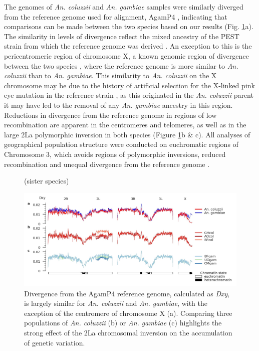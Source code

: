 \documentclass[a4paper,11pt,abstracton,hidelinks]{scrartcl}
\begin{document}
The genomes of \textit{An. coluzzii} and \textit{An. gambiae} samples were similarly diverged from the reference genome used for alignment, AgamP4 \cite{Holt2002}, indicating that comparisons can be made between the two species based on our results (Fig. \ref{refdiff}a).
%
The similarity in levels of divergence reflect the mixed ancestry of the PEST strain from which the reference genome was derived \cite{Holt2002}.
%
An exception to this is the pericentromeric region of chromosome X, a known genomic region of divergence between the two species \cite{Ag1000gConsortium2017}, where the reference genome is more similar to \textit{An. coluzzii} than to \textit{An. gambiae}.
%
This similarity to \textit{An. coluzzii} on the X chromosome may be due to the history of artificial selection for the X-linked pink eye mutation in the reference strain \cite{Holt2002}, as this originated in the \textit{An. coluzzii} parent it may have led to the removal of any \textit{An. gambiae} ancestry in this region.
%
Reductions in divergence from the reference genome in regions of low recombination are apparent in the centromeres and telomeres, as well as in the large 2La polymorphic inversion in both species \cite{coluzzi2002} (Figure \ref{refdiff}b \& c). 
%
All analyses of geographical population structure were conducted on euchromatic regions of Chromosome 3, which avoids regions of polymorphic inversions, reduced recombination and unequal divergence from the reference genome \cite{Ag1000gConsortium2017}.

\begin{figure}[h](sister species)
	\begin{center}
		\includegraphics*[width=6.3in]{notebooks/refdiff/refdiff_phase2_combined.jpg}
	\end{center}
	\caption{Divergence from the AgamP4 reference genome, calculated as \textit{Dxy}, is largely similar for \textit{An. coluzzii} and \textit{An. gambiae}, with the exception of the centromere of chromosome X (a). Comparing three populations of \textit{An. coluzzii} (b) or \textit{An. gambiae} (c) highlights the strong effect of the 2La chromosomal inversion on the accumulation of genetic variation.}
	\label{refdiff}
\end{figure}
\end{document}
